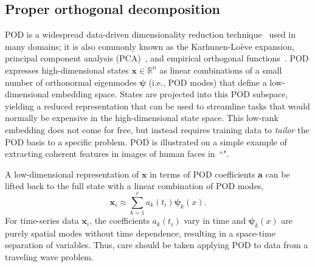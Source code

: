 \documentclass[letterpaper]{IEEEtran}
\newcommand{\bx}{\mathbf{x}}
\newcommand{\bpsi}{\boldsymbol\psi}
\newcommand{\reals}{\mathbb{R}}
\begin{document}
\subsection{Proper orthogonal decomposition}%

POD is a widespread data-driven dimensionality reduction technique~\cite{berkooz1993proper,HLBR_turb} used in many domains; it is also commonly known as the Karhunen-Lo\`eve expansion, principal component analysis (PCA)~\cite{Pearson:1901}, and empirical orthogonal functions~\cite{lorenzMITTR56}. 
POD expresses high-dimensional states $\bx\in\reals^n$ as linear combinations of a small number of orthonormal eigenmodes $\bpsi$ (i.e., POD modes) that define a low-dimensional embedding space. States are projected into this POD subspace, yielding a reduced representation that can be used to streamline tasks that would normally be expensive in the high-dimensional state space. 
This low-rank embedding does not come for free, but instead requires training data to \emph{tailor} the POD basis to a specific problem.  
POD is illustrated on a simple example of extracting coherent features in images of human faces in~``".%

A low-dimensional representation of $\bx$ in terms of POD coefficients $\mathbf{a}$ can be lifted back to the full state with a linear combination of POD modes,
\begin{equation*}
\bx_i \approx \sum_{k=1}^r a_k(t_i)\bpsi_k(x).
\end{equation*}
For time-series data $\bx_i$, the coefficients $a_k(t_i)$ vary in time and $\bpsi_k(x)$ are purely spatial modes without time dependence, resulting in a space-time separation of variables.  
Thus, care should be taken applying POD to data from a traveling wave problem.   
\end{document}
